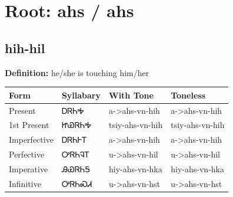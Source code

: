 \documentclass{article}%
\begin{document}
%
\normalsize%
\section*{Root: ahs / ahs}%
\subsection*{hih-hil}%
\textbf{Definition: }%
he/she is touching him/her%
\\[0.5em]%
\begin{tabular}{|l|l|l|l|}%
\hline%
\textbf{Form}&\textbf{Syllabary}&\textbf{With Tone}&\textbf{Toneless}\\%
\hline%
Present&ᎠᏒᏂᎭ&a{-}>ahs{-}vn{-}hih&a{-}>ahs{-}vn{-}hih\\%
1st Present&ᏥᏯᏒᏂᎭ&tsiy{-}ahs{-}vn{-}hih&tsiy{-}ahs{-}vn{-}hih\\%
Imperfective&ᎠᏒᏂᎰᎢ&a{-}>ahs{-}vn{-}hih&a{-}>ahs{-}vn{-}hih\\%
Perfective&ᎤᏒᏂᎸᎢ&u{-}>ahs{-}vn{-}hil&u{-}>ahs{-}vn{-}hil\\%
Imperative&ᎯᏯᏒᏂᎦ&hiy{-}ahs{-}vn{-}hka&hiy{-}ahs{-}vn{-}hka\\%
Infinitive&ᎤᏒᏂᏍᏗ&u{-}>ahs{-}vn{-}hst&u{-}>ahs{-}vn{-}hst\\%
\hline%
\end{tabular}%
\\[1em]%
\end{document}
